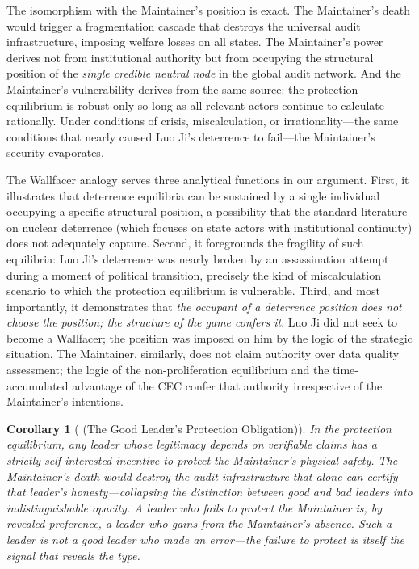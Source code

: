 \documentclass[12pt,a4paper]{article}
\newtheorem{corollary}[theorem]{Corollary}
\theoremstyle{definition}
\theoremstyle{remark}
\begin{document}
The isomorphism with the Maintainer's position is exact. The Maintainer's death would trigger a fragmentation cascade that destroys the universal audit infrastructure, imposing welfare losses on all states. The Maintainer's power derives not from institutional authority but from occupying the structural position of the \textit{single credible neutral node} in the global audit network. And the Maintainer's vulnerability derives from the same source: the protection equilibrium is robust only so long as all relevant actors continue to calculate rationally. Under conditions of crisis, miscalculation, or irrationality—the same conditions that nearly caused Luo Ji's deterrence to fail—the Maintainer's security evaporates.

The Wallfacer analogy serves three analytical functions in our argument. First, it illustrates that deterrence equilibria can be sustained by a single individual occupying a specific structural position, a possibility that the standard literature on nuclear deterrence (which focuses on state actors with institutional continuity) does not adequately capture. Second, it foregrounds the fragility of such equilibria: Luo Ji's deterrence was nearly broken by an assassination attempt during a moment of political transition, precisely the kind of miscalculation scenario to which the protection equilibrium is vulnerable. Third, and most importantly, it demonstrates that \textit{the occupant of a deterrence position does not choose the position; the structure of the game confers it}. Luo Ji did not seek to become a Wallfacer; the position was imposed on him by the logic of the strategic situation. The Maintainer, similarly, does not claim authority over data quality assessment; the logic of the non-proliferation equilibrium and the time-accumulated advantage of the CEC confer that authority irrespective of the Maintainer's intentions.

\begin{corollary}[ (The Good Leader's Protection Obligation)]
\label{cor:good-leader-protection}
In the protection equilibrium, any leader whose legitimacy depends on verifiable claims has a strictly self-interested incentive to protect the Maintainer's physical safety. The Maintainer's death would destroy the audit infrastructure that alone can certify that leader's honesty—collapsing the distinction between good and bad leaders into indistinguishable opacity. A leader who fails to protect the Maintainer is, by revealed preference, a leader who gains from the Maintainer's absence. Such a leader is not a good leader who made an error—the failure to protect is itself the signal that reveals the type.
\end{corollary}
\end{document}
